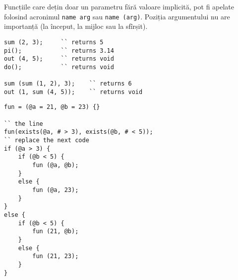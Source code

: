 Funcțiile care dețin doar un parametru fără valoare implicită, pot fi apelate folosind acronimul \lstinline|name arg| sau \lstinline|name (arg)|. Poziția argumentului nu are importanță (la început, la mijloc sau la sfîrșit).

\begin{lstlisting}[caption=Apeluri de funcții, label=callfunc]
sum (2, 3); 	`` returns 5
pi();			`` returns 3.14
out (4, 5); 	`` returns void
do();			`` returns void

sum (sum (1, 2), 3);	`` returns 6
out (1, sum (4, 5));	`` returns void
\end{lstlisting}

\begin{lstlisting}[caption=Valori predefinite, label=defaultparametrs]
fun = (@a = 21, @b = 23) {}

`` the line 
fun(exists(@a, # > 3), exists(@b, # < 5));
`` replace the next code
if (@a > 3) {
	if (@b < 5) {
		fun (@a, @b);
	}
	else {
		fun (@a, 23);
	}
}
else {
	if (@b < 5) {
		fun (21, @b);
	}
	else {
		fun (21, 23);
	}
}
\end{lstlisting}

